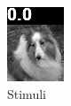 \begin{figure}[H]
  \begin{subfigure}[t]{0.15\textwidth}
    \centering
    \includegraphics[width=\linewidth]{img/one-trial/loss_eval/L1/stimulus_1_original_L1.png}
    \caption{Stimuli}
  \end{subfigure}
  \begin{subfigure}[t]{0.15\textwidth}
    \centering

\end{subfigure}
\end{figure}
